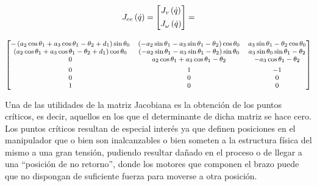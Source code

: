 \begin{gather}\label{eq:j}
    J_{ee}\left(\dot{q}\right) =
    \begin{bmatrix}
        J_v\left(\dot{q}\right) \\[1ex]
        J_{\omega}\left(\dot{q}\right)
    \end{bmatrix} = \\[2ex]
    {\footnotesize\begin{bmatrix}
        - \left(a_{2} \cos{\theta_{1}} + a_{3} \cos{\theta_{1} - \theta_{2}} + d_{1}\right) \sin{\theta_{0}} & \left(- a_{2} \sin{\theta_{1}} - a_{3} \sin{\theta_{1} - \theta_{2}}\right) \cos{\theta_{0}} & a_{3} \sin{\theta_{1} - \theta_{2}} \cos{\theta_{0}} \\
        \left(a_{2} \cos{\theta_{1}} + a_{3} \cos{\theta_{1} - \theta_{2}} + d_{1}\right) \cos{\theta_{0}}   & \left(- a_{2} \sin{\theta_{1}} - a_{3} \sin{\theta_{1} - \theta_{2}}\right) \sin{\theta_{0}} & a_{3} \sin{\theta_{0}} \sin{\theta_{1} - \theta_{2}} \\
        0                                                                                                    & a_{2} \cos{\theta_{1}} + a_{3} \cos{\theta_{1} - \theta_{2}}                                 & - a_{3} \cos{\theta_{1} - \theta_{2}}                \\[1ex]
        0                                                                                                    & 1                                                                                            & -1                                                   \\
        0                                                                                                    & 0                                                                                            & 0                                                    \\
        1                                                                                                    & 0                                                                                            & 0                                                    \\
    \end{bmatrix}} \nonumber
\end{gather}

Una de las utilidades de la matriz Jacobiana es la obtención de los puntos críticos,
es decir, aquellos en los que el determinante de dicha matriz se hace cero. Los puntos
críticos resultan de especial interés ya que definen posiciones en el manipulador que o
bien son inalcanzables o bien someten a la estructura física del mismo a una gran tensión,
pudiendo resultar dañado en el proceso o de llegar a una ``posición de no retorno'', donde
los motores que componen el brazo puede que no dispongan de suficiente fuerza para moverse a otra
posición.

